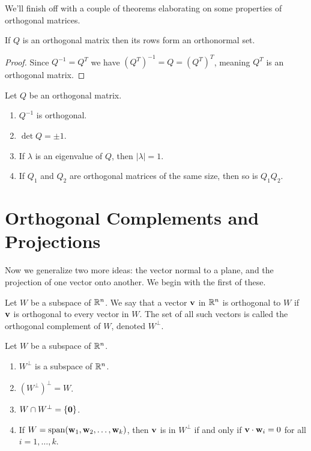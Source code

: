 \documentclass[../m073main.tex]{subfiles}
\begin{document}
We'll finish off with a couple of theorems elaborating on some properties of orthogonal matrices.

\begin{theorem}
	If $Q$ is an orthogonal matrix then its rows form an orthonormal set.
\end{theorem}

\begin{proof}
	Since $Q^{-1} = Q^T$ we have $(Q^T)^{-1} = Q = (Q^T)^T$, meaning $Q^T$ is an orthogonal matrix.
\end{proof}

\begin{theorem}
	Let $Q$ be an orthogonal matrix.
	\begin{enumerate}[label=(\alph*)]
		\item $Q^{-1}$ is orthogonal.
		\item $\det Q = \pm 1$.
		\item If $\lambda$ is an eigenvalue of $Q$, then $|\lambda| = 1$.
		\item If $Q_1$ and $Q_2$ are orthogonal matrices of the same size, then so is $Q_1 Q_2$.
	\end{enumerate}
\end{theorem}

\section{Orthogonal Complements and Projections}
Now we generalize two more ideas: the vector normal to a plane, and the projection of one vector onto another.           
We begin with the first of these.

\begin{definition}
	Let $W$ be a subspace of $\mathbb{R}^n$.
	We say that a vector $\mathbf{v}$ in $\mathbb{R}^n$ is orthogonal to $W$ if $\mathbf{v}$ is orthogonal to every vector in $W$.
	The set of all such vectors is called the orthogonal complement of $W$, denoted $W^\perp$.
\end{definition}

\begin{theorem}
	Let $W$ be a subspace of $\mathbb{R}^n$.
	\begin{multicols}{2}
		\begin{enumerate}[label=(\alph*)]
			\item $W^\perp$ is a subspace of $\mathbb{R}^n$.
			\item $\left( W^\perp \right)^\perp = W$.
			\item $W \cap W^\perp = \{\mathbf{0}\}$.
			\item If $W = \operatorname{span}(\mathbf{w}_1, \mathbf{w}_2, \ldots, \mathbf{w}_k)$, then $\mathbf{v}$ is in $W^\perp$ if and only if $\mathbf{v} \cdot \mathbf{w}_i = 0$ for all $i = 1, \ldots, k$.
		\end{enumerate}
	\end{multicols}
\end{theorem}
\end{document}
